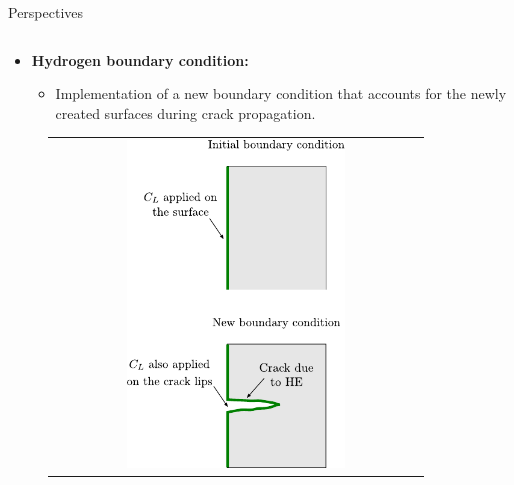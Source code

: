\documentclass[9pt]{beamer}
\begin{document}
\begin{frame}{Perspectives}
\begin{columns}
    	\vspace{0.2cm}
    		

        \begin{column}{0.5\textwidth}
        
        \begin{itemize}
        	\item \textbf{Hydrogen boundary condition:}
        	\vspace{0.15cm}
        	\begin{itemize}
        		\item Implementation of a new boundary condition that accounts for the newly created surfaces during crack propagation.
        	\end{itemize}
        \end{itemize}
        \vspace{0.2cm}
        	\begin{figure}
        		\begin{tabular}{c}
            		\includegraphics[width=0.6\textwidth]{Images/new_BC_CL.pdf} \\
        		\end{tabular}
    		\end{figure}
        \end{column}

    \end{columns}
    
\end{frame}
\end{document}

